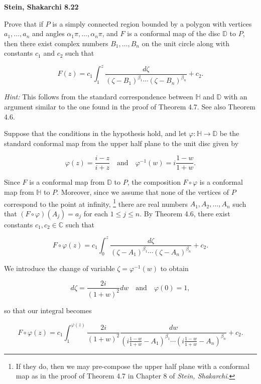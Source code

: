 \textbf{Stein, Shakarchi 8.22}

Prove that if $P$ is a simply connected region bounded by a polygon with vertices $a_1, \dots, a_n$ and angles 
$\alpha_1 \pi, \dots, \alpha_n \pi$, and $F$ is a conformal map of the disc $\mathbb{D}$ to $P$, then there exist 
complex numbers $B_1, \dots, B_n$ on the unit circle along with constants $c_1$ and $c_2$ such that

$$
F(z) = c_1 \int_1^z \frac{d\zeta}{(\zeta - B_1)^{\beta_1} \cdots (\zeta - B_n)^{\beta_n}} + c_2.
$$

\textit{Hint: } This follows from the standard correspondence between $\mathbb{H}$ and $\mathbb{D}$ with an argument 
similar to the one found in the proof of Theorem 4.7. See also Theorem 4.6.

\begin{solution}
  Suppose that the conditions in the hypothesis hold, and let $\varphi: \mathbb{H} \to \mathbb{D}$ be the standard 
  conformal map from the upper half plane to the unit disc given by

  $$
  \varphi(z) = \frac{i - z}{i + z} \quad \text{and} \quad \varphi^{-1}(w) = i \frac{1 - w}{1 + w}.
  $$

  Since $F$ is a conformal map from $\mathbb{D}$ to $P$, the composition $F \circ \varphi$ is a conformal map from 
  $\mathbb{H}$ to $P$. Moreover, since we assume that none of the vertices of $P$ correspond to the point at infinity,
  \footnote{
    If they do, then we may pre-compose the upper half plane with a conformal map as in the proof of Theorem 4.7 in 
    Chapter 8 of \textit{Stein, Shakarchi}.
  } there are real numbers $A_1, A_2, \dots, A_n$ such that $(F \circ \varphi) (A_j) = a_j$ for each $1 \le j \le n$. By 
  Theorem 4.6, there exist constants $c_1, c_2 \in \mathbb{C}$ such that

  $$
  F \circ \varphi(z) = c_1 \int_0^z \frac{d\zeta}{(\zeta - A_1)^{\beta_1} \cdots (\zeta - A_n)^{\beta_n}} + c_2.
  $$

  We introduce the change of variable $\zeta = \varphi^{-1}(w)$ to obtain

  $$
  d\zeta = \frac{2i}{(1 + w)^2} dw \quad \text{and} \quad \varphi(0) = 1,
  $$

  so that our integral becomes

  $$
  F \circ \varphi(z) = c_1 \int_1^{\varphi(z)} \frac{2 i }{(1 + w)^2} \frac{dw}{\left(i \frac{1 - w}{1 + w} - A_1\right)^{\beta_1} \cdots \left(i \frac{1 - w}{1 + w}  - A_n\right)^{\beta_n}} + c_2.
  $$


\end{solution}
